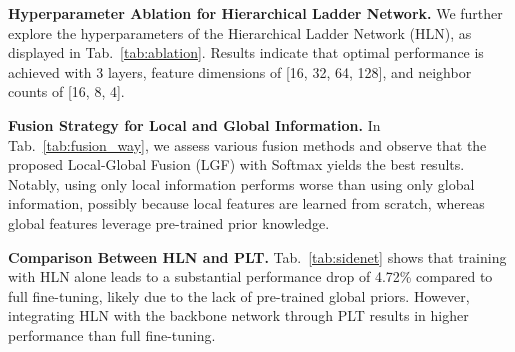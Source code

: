 \textbf{Hyperparameter Ablation for Hierarchical Ladder Network.} We further explore the hyperparameters of the Hierarchical Ladder Network (HLN), as displayed in Tab.~\ref{tab:ablation}. Results indicate that optimal performance is achieved with 3 layers, feature dimensions of [16, 32, 64, 128], and neighbor counts of [16, 8, 4].

\textbf{Fusion Strategy for Local and Global Information.} In Tab.~\ref{tab:fusion_way}, we assess various fusion methods and observe that the proposed Local-Global Fusion (LGF) with Softmax yields the best results. Notably, using only local information performs worse than using only global information, possibly because local features are learned from scratch, whereas global features leverage pre-trained prior knowledge.

\textbf{Comparison Between HLN and PLT.} Tab.~\ref{tab:sidenet} shows that training with HLN alone leads to a substantial performance drop of 4.72\% compared to full fine-tuning, likely due to the lack of pre-trained global priors. However, integrating HLN with the backbone network through PLT results in higher performance than full fine-tuning.





